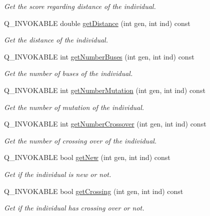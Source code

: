 \begin{DoxyCompactItemize}
\begin{DoxyCompactList}\small\item\em Get the score regarding distance of the individual. \end{DoxyCompactList}\item 
Q\+\_\+\+I\+N\+V\+O\+K\+A\+B\+LE double \hyperlink{class_generation_table_model_ae0369f444796e2df883528cef9e92b4e}{get\+Distance} (int gen, int ind) const
\begin{DoxyCompactList}\small\item\em Get the distance of the individual. \end{DoxyCompactList}\item 
Q\+\_\+\+I\+N\+V\+O\+K\+A\+B\+LE int \hyperlink{class_generation_table_model_a01e8f13d7dee94267b57b287b67773cb}{get\+Number\+Buses} (int gen, int ind) const
\begin{DoxyCompactList}\small\item\em Get the number of buses of the individual. \end{DoxyCompactList}\item 
Q\+\_\+\+I\+N\+V\+O\+K\+A\+B\+LE int \hyperlink{class_generation_table_model_a501bf9195efc15cd8c9a56c6faa0a985}{get\+Number\+Mutation} (int gen, int ind) const
\begin{DoxyCompactList}\small\item\em Get the number of mutation of the individual. \end{DoxyCompactList}\item 
Q\+\_\+\+I\+N\+V\+O\+K\+A\+B\+LE int \hyperlink{class_generation_table_model_ac34258da2589b7cef71d6f8067b3c795}{get\+Number\+Crossover} (int gen, int ind) const
\begin{DoxyCompactList}\small\item\em Get the number of crossing over of the individual. \end{DoxyCompactList}\item 
Q\+\_\+\+I\+N\+V\+O\+K\+A\+B\+LE bool \hyperlink{class_generation_table_model_a8c771dcf22a7d54e77321584e3bbe065}{get\+New} (int gen, int ind) const
\begin{DoxyCompactList}\small\item\em Get if the individual is new or not. \end{DoxyCompactList}\item 
Q\+\_\+\+I\+N\+V\+O\+K\+A\+B\+LE bool \hyperlink{class_generation_table_model_aaad68ad9dd0a6990bdd3c268ebde67ef}{get\+Crossing} (int gen, int ind) const
\begin{DoxyCompactList}\small\item\em Get if the individual has crossing over or not. \end{DoxyCompactList}\item 

\end{DoxyCompactItemize}
